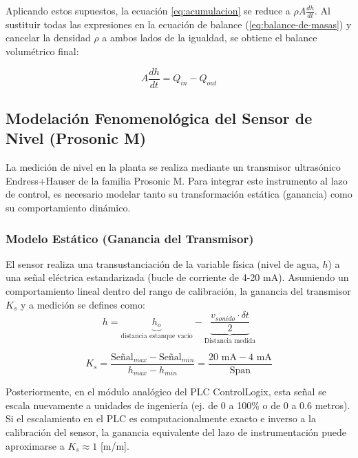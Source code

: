 Aplicando estos supuestos, la ecuación \ref{eq:acumulacion} se reduce a $\rho A \frac{dh}{dt}$. Al sustituir todas las expresiones en la ecuación de balance (\ref{eq:balance-de-masas}) y cancelar la densidad $\rho$ a ambos lados de la igualdad, se obtiene el balance volumétrico final:

\begin{equation}
  A\frac{dh}{dt} = Q_{in} - Q_{out}
  \label{eq:balance_volumetrico}
\end{equation}

\subsection{Modelación Fenomenológica del Sensor de Nivel (Prosonic M)}

La medición de nivel en la planta se realiza mediante un transmisor ultrasónico Endress+Hauser de la familia Prosonic M. Para integrar este instrumento al lazo de control, es necesario modelar tanto su transformación estática (ganancia) como su comportamiento dinámico.

\subsubsection{Modelo Estático (Ganancia del Transmisor)}
El sensor realiza una transustanciación de la variable física (nivel de agua, $h$) a una señal eléctrica estandarizada (bucle de corriente de 4-20 mA). Asumiendo un comportamiento lineal dentro del rango de calibración, la ganancia del transmisor $K_s$ y a medición se defines como:
\begin{equation}
  h = \underbrace{h_o}_\text{distancia estanque vacío} - \underbrace{\frac{v_{sonido}\cdot \delta t}{2}}_\text{Distancia medida}
  \label{prosonic}
\end{equation}

\begin{equation}
  K_s = \frac{\text{Señal}_{max} - \text{Señal}_{min}}{h_{max} - h_{min}} = \frac{20\text{ mA} - 4\text{ mA}}{\text{Span}}
  \label{eq:ganancia_sensor}
\end{equation}

Posteriormente, en el módulo analógico del PLC ControlLogix, esta señal se escala nuevamente a unidades de ingeniería (ej. de 0 a 100\% o de 0 a 0.6 metros). Si el escalamiento en el PLC es computacionalmente exacto e inverso a la calibración del sensor, la ganancia equivalente del lazo de instrumentación puede aproximarse a $K_s \approx 1$ [m/m].

